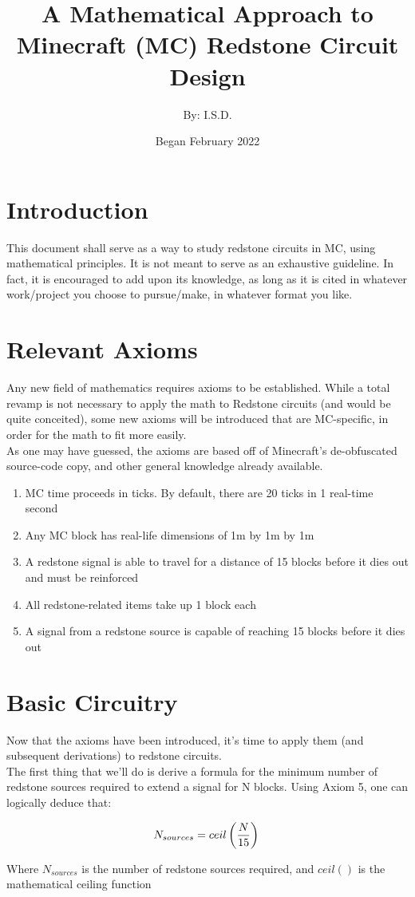 \documentclass{article}
\title{A Mathematical Approach to Minecraft (MC) Redstone Circuit Design}
\author{By: I.S.D.}
\date{Began February 2022}
\begin{document}
\maketitle

\section{Introduction}

This document shall serve as a way to study redstone circuits in MC, using mathematical principles. It is not meant to serve as an exhaustive guideline. In fact, it is encouraged to add upon its knowledge, as long as it is cited in whatever work/project you choose to pursue/make, in whatever format you like.

\section{Relevant Axioms}
Any new field of mathematics requires axioms to be established. While a total revamp is not necessary to apply the math to Redstone circuits (and would be quite conceited), some new axioms will be introduced that are MC-specific, in order for the math to fit more easily. \\

\noindent
As one may have guessed, the axioms are based off of Minecraft's de-obfuscated source-code copy, and other general knowledge already available.

\begin{enumerate}
\item MC time proceeds in ticks. By default, there are 20 ticks in 1 real-time second
\item Any MC block has real-life dimensions of 1m by 1m by 1m
\item A redstone signal is able to travel for a distance of 15 blocks before it dies out and must be reinforced
\item All redstone-related items take up 1 block each
\item A signal from a redstone source is capable of reaching 15 blocks before it dies out
\end{enumerate}

\section{Basic Circuitry}
Now that the axioms have been introduced, it's time to apply them (and subsequent derivations) to redstone circuits. \\

\noindent
The first thing that we'll do is derive a formula for the minimum number of redstone sources required to extend a signal for N blocks. Using Axiom 5, one can logically deduce that:

\begin{equation}
    N_{sources} = ceil \left( \frac{N}{15} \right) \\
\end{equation}

\noindent
Where $N_{sources}$ is the number of redstone sources required, and $ceil()$ is the mathematical ceiling function
\end{document}
